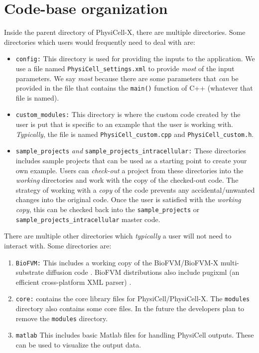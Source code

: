 \documentclass[12pt]{article}
\newcommand{\blue}[1]{\textcolor{blue}{#1}}
\newcommand{\DONE}{}%
\begin{document}
\section{Code-base organization \DONE}
Inside the parent directory of PhysiCell-X, there are multiple directories. Some directories which users would frequently need to deal with are:
\begin{itemize}
    \item \texttt{config:} This directory is used for providing the inputs to the application. We use a file named \texttt{PhysiCell\_settings.xml} to provide \textit{most} of the input parameters. We say \textit{most} because there are some parameters that \textit{can} be provided in the file that contains the \texttt{main()} function of C++ (whatever that file is named).

\item 
\texttt{custom\_modules:} This directory is where the custom code created by the user is put that is specific to an example that the user is working with. \textit{Typically}, the file is named \texttt{PhysiCell\_custom.cpp} and \texttt{PhysiCell\_custom.h}. 

\item 
\texttt{sample\_projects} \textit{and} \texttt{sample\_projects\_intracellular:} These directories includes sample projects that can be used as a starting point to create your own example. Users can \textit{check-out} a project from these directories into the \textit{working} directories and work with the copy of the checked-out code. The strategy of working with a \textit{copy} of the code prevents any accidental/unwanted changes into the original code. Once the user is satisfied with the \textit{working copy}, this can be checked back into the \texttt{sample\_projects} or \texttt{sample\_projects\_intracellular} master code. 
\end{itemize}

There are multiple other directories which \textit{typically} a user will not need to interact with. Some directories are: 

\begin{enumerate}
\item 
\texttt{BioFVM:} This includes a working copy of the BioFVM/BioFVM-X multi-substrate diffusion code \cite{ref:BioFVM, saxena2021biofvm}. BioFVM distributions also include 
pugixml (an efficient cross-platform XML parser) \cite{ref:pugixml}. 

\item 
\texttt{core:} contains the core library files for PhysiCell/PhysiCell-X. The \texttt{modules} directory also contains some core files. In the future the developers plan to remove the \texttt{modules} directory. 

\item 
\texttt{matlab} This includes basic Matlab files for handling PhysiCell outputs. These can be used to visualize the output data. 
 
\end{enumerate}
\end{document}
